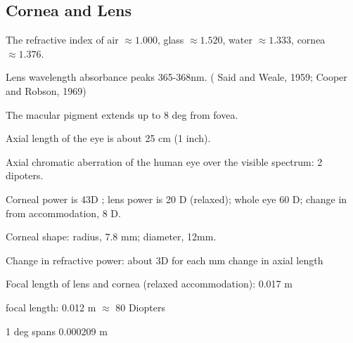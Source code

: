 \subsection*{Cornea and Lens}

\be

\item The refractive index of air $\approx 1.000$, glass $\approx
1.520$, water $\approx 1.333$, cornea $\approx 1.376$.

\item Lens wavelength absorbance peaks 365-368nm.
( Said and Weale, 1959; Cooper and Robson, 1969)


\item The macular pigment extends up to 8 deg from fovea.

\item Axial length of the eye is about 25 cm (1 inch).

\item Axial chromatic aberration of the human eye over the visible
spectrum: 2 dipoters.

\item Corneal power is 43D ; lens power is 20 D (relaxed); whole eye 60 D;
change in from accommodation, 8 D.

\item Corneal shape:  radius, 7.8 mm; diameter, 12mm.

\item Change in refractive power: about  3D for each mm change in axial length

\item Focal length of lens and cornea (relaxed accommodation): 0.017 m

\item [Macaque] focal length:  0.012 m $\approx$ 80 Diopters

\item [Macaque] 1 deg spans 0.000209 m

\ee


